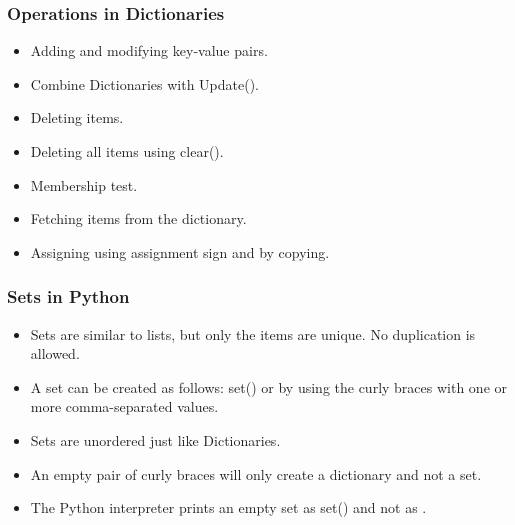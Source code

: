 \documentclass{beamer}
\begin{document}
\begin{frame}
\frametitle{Operations in Dictionaries}
\begin{itemize}
\item Adding and modifying key-value pairs.
\item Combine Dictionaries with Update().
\item Deleting items.
\item Deleting all items using clear().
\item Membership test.
\item Fetching items from the dictionary.
\item Assigning using assignment sign and by copying.
\end{itemize}
\end{frame}

\begin{frame}[fragile]
\frametitle{Sets in Python}
\begin{itemize}
\item Sets are similar to lists, but only the items are unique. No duplication is allowed.
\item A set can be created as follows: set() or by using the curly braces with one or more comma-separated values.
\item Sets are unordered just like Dictionaries.
\item An empty pair of curly braces will only create a dictionary and not a set.
\item The Python interpreter prints an empty set as set() and not as {}.
\end{itemize}
\end{frame}
\end{document}
